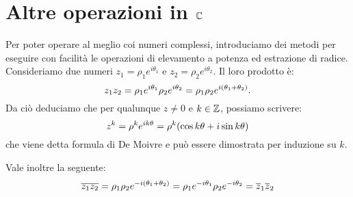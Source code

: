     \section{Altre operazioni in $\mathbb{C}$}
        Per poter operare al meglio coi numeri complessi, introduciamo dei metodi per eseguire con facilit\`a le operazioni di elevamento a potenza ed estrazione di radice. Consideriamo due numeri $z_1=\rho_1e^{i\theta_1}$ e $z_2=\rho_2e^{i\theta_2}$. Il loro prodotto \`e: $$z_1z_2=\rho_1e^{i\theta_1}\rho_2e^{i\theta_2}=\rho_1\rho_2e^{i\qty(\theta_1+\theta_2)}.$$ Da ci\`o deduciamo che per qualunque $z\neq 0$ e $k\in\mathbb{Z}$, possiamo scrivere:
        \begin{equation}
            z^k=\rho^ke^{ik\theta}=\rho^k\qty(\cos k\theta+i\sin k\theta)
            \label{eq:demoivre}
        \end{equation}
        che viene detta formula di De Moivre e pu\`o essere dimostrata per induzione su $k$.
        \par Vale inoltre la seguente:
            $$\overline{z_1z_2}=\rho_1\rho_2e^{-i\qty(\theta_1+\theta_2)}=\rho_1e^{-i\theta_1}\rho_2e^{-i\theta_2}=\overline{z}_1\overline{z}_2$$
        
        